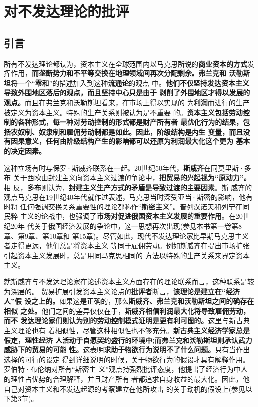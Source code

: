 \chapter{对不发达理论的批评}

\section{引言}

所有不发达理论都认为，资本主义在全球范围内以马克思所说的\textbf{商业资本的方式}发
挥作用，\textbf{而垄断势力和不平等交换在地理领域间再次分配剩余。}\textbf{弗兰克和
  沃勒斯坦}将一个“\textbf{零和}”的描述加入到这种\textbf{流通论}的观点
中。\textbf{他们不仅坚持发达资本主义导致外围地区落后的观点，而且坚持中心只是由于
  剥削了外围地区才得以发展的观点。}而且在弗兰克和沃勒斯坦看来，在市场上得以实现的
为\textbf{利润}而进行的生产被定义为资本主义。特殊的生产关系则被认为是不重要
的。\textbf{资本主义包括劳动控制的各种形式，每一种对劳动控制的形式都是财产所有者
  最优化行为的结果，包括农奴制、奴隶制和雇佣劳动制都是如此。因此，阶级结构是内生
  变量，而且没有因果意义，任何由阶级结构产生的影响都可以还原为利润最大化这个更为
  基本的决定因素。}

这种立场有时与保罗·斯威齐联系在一起。20世纪50年代，\textbf{斯威齐}在同莫里斯·多布
关于西欧由封建主义向资本主义过渡的争论中，\textbf{把贸易的兴起视为“原动力”。}相
反，\textbf{多布}则认为，\textbf{封建主义生产方式的矛盾是导致过渡的主要因素}。斯
威齐的观点马克思在19世纪40年代就作过表述，马克思当时深受亚当·斯密的影响，他有时将
任何强调交换关系重要性的理论都称作“\textbf{斯密主义}”。普列汉诺夫和列宁在同民粹
主义的论战中，也强调了\textbf{市场对促进俄国资本主义发展的重要作用}。在20世纪20年
代关于俄国经济发展的争论中，这一思想再次出现(参见本书第一卷第8章、第9章、第10章和
第15章)。尽管如此，现代不发达理论家比早期马克思主义者走得更远，他们总是将资本主义
等同于雇佣劳动。例如斯威齐在提出市场扩张引起资本主义发展时，总是用同马克思相同的
方法以特殊的生产关系来界定资本主义。

就斯威齐与不发达理论家在论述资本主义方面存在的理论联系而言，这种联系是较为深层的。
贸易扩展引发资本主义论点的\textbf{批评者}断言，\textbf{该理论是建立在“经济人”假
  设之上的。}如果这是正确的，那么\textbf{斯威齐、弗兰克和沃勒斯坦之间的确存在相似
  之处。}他们之间的差异仅仅在于，\textbf{斯威齐相信利润最大化将导致雇佣劳动，而不
  发达理论家们则认为别的劳动控制模式证明是更有利可图的。}这里与新古典主义理论也有
着相似性，尽管这种相似性也不够充分。\textbf{新古典主义经济学家总是假定，理性经济
  人活动于自愿契约盛行的环境中;而弗兰克和沃勒斯坦则承认武力威胁下的贸易的可能
  性。}这表明\textbf{求助于物欲行为说明不了什么问题。}只有当作出选择的可行的设定
得到详细说明的时候，关于物欲行为的假设才具有解释作用。罗伯特·布伦纳对所有“斯密主
义”观点持强烈批评态度，他提出了经济行为中人的理性占优势的合理解释，并且财产所有
者都追求自身收益的最大化。因此，他自己对资本主义和不发达起源的考察建立在他所攻击
的关于动机的假设上(参见以下第3节)。

